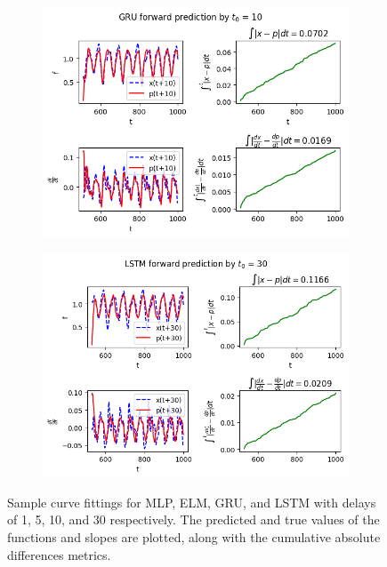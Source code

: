\documentclass[11pt]{article}
\begin{document}
\begin{figure}[t]
\begin{center}
\begin{subfigure}{0.48\textwidth}
        \includegraphics[width=\textwidth]{figures/GRU_10.png}
        \caption{}
      \end{subfigure}
      \begin{subfigure}{0.48\textwidth}
        \includegraphics[width=\textwidth]{figures/LSTM_30.png}
        \caption{}
      \end{subfigure}
 \end{center}
 \caption{Sample curve fittings for MLP, ELM, GRU, and LSTM with
   delays of 1, 5, 10, and 30 respectively. The predicted and true
   values of the functions and slopes are plotted, along with the
   cumulative absolute differences metrics.}
 \label{fig:func_evals}
\end{figure}
\end{document}
